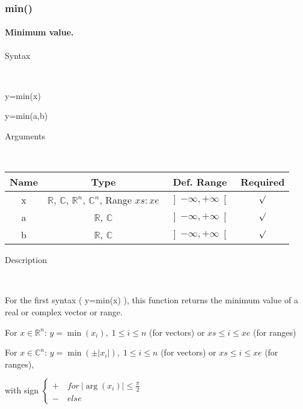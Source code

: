 \newpage
\subsubsection*{\hypertarget{min}{}{\Large min()}}


\paragraph{\label{par:Minimum}Minimum value.}

\begin{description}
\item [Syntax]~
\end{description}
y=min(x)

\begin{flushleft}y=min(a,b)\end{flushleft}

\begin{description}
\item [Arguments]~
\end{description}
\begin{tabular}{|c|c|c|c|}
\hline 
Name&
Type&
Def. Range&
Required\tabularnewline
\hline
\hline 
x&
$\mathbb{R}$, $\mathbb{C}$, $\mathbb{R}^{n}$, $\mathbb{C}^{n}$,
Range $xs:xe$&
$\left]-\infty,+\infty\right[$&
$\surd$\tabularnewline
\hline
\hline 
a&
$\mathbb{R}$, $\mathbb{C}$&
$\left]-\infty,+\infty\right[$&
$\surd$\tabularnewline
\hline 
b&
$\mathbb{R}$, $\mathbb{C}$&
$\left]-\infty,+\infty\right[$&
$\surd$\tabularnewline
\hline
\end{tabular}
\begin{description}
\item [Description]~
\end{description}
For the first syntax ( y=min(x) ), this function returns the minimum
value of a real or complex vector or range.

\medskip{}
For $x\in$$\mathbb{R}^{n}$: $y=$$\min\left(x_{i}\right),\;1\leq i\leq n$
(for vectors) or $xs\leq i\leq xe$ (for ranges)
\medskip{}

For $x\in\mathbb{C}^{n}$: $y=\min\left(\pm\left|x_{i}\right|\right),\;1\leq i\leq n$
(for vectors) or $xs\leq i\leq xe$ (for ranges),

with sign $\left\{ \begin{array}{l}
+\quad for\:\left|\arg\left(x_{i}\right)\right|\leq\frac{\pi}{2}\\
-\quad else\end{array}\right.$
\medskip{}

